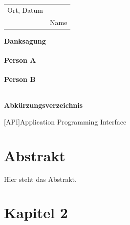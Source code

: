 \documentclass[a4paper, 12pt, oneside, openright]{article}
\begin{document}
\begin{tabular}{@{}p{6cm}p{6cm}@{}}
Ort, Datum & \hrulefill \\
& Name \\
\end{tabular}

                              
\newpage

{} 
\textbf{\Large Danksagung}\\
\vspace{0.5cm}\\
\textbf{Person A} \\\\
\textbf{Person B} \\\\
\newpage

{} 
\textbf{\Large Abkürzungsverzeichnis}\\
\begingroup
\setlength{\labelsep}{1cm}
\begin{acronym}[XXXXXX]
[API]{Application Programming Interface}
\end{acronym}
\endgroup
\newpage

{} 
\listoffigures
\newpage

{}
\tableofcontents
\newpage

\setcounter{page}{1}
\section{Abstrakt}
Hier steht das Abstrakt.
\newpage

\section{Kapitel 2}
\end{document}
